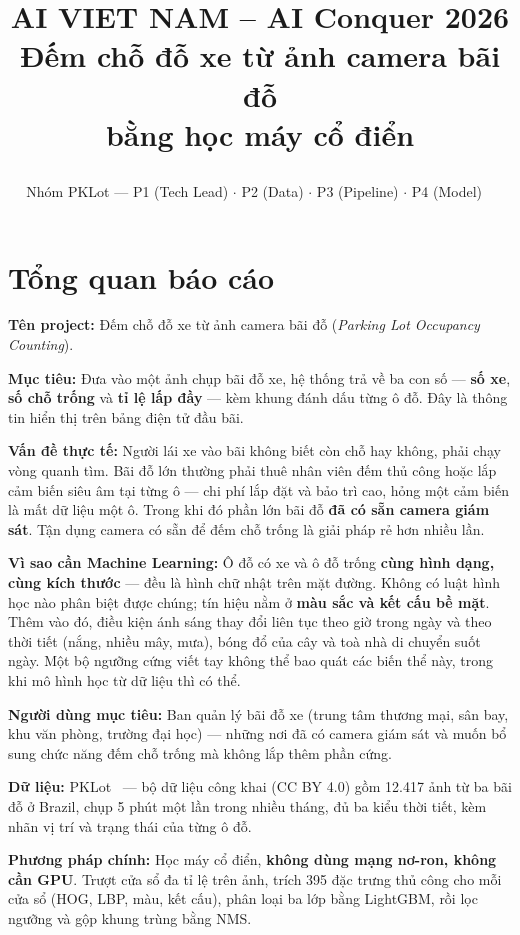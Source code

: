 \documentclass[12pt]{ai_conquer2026}
\title{%
  \begin{center}
        \Large {AI VIET NAM -- AI Conquer 2026}\\[.5ex]
        \Huge \textbf{Đếm chỗ đỗ xe từ ảnh camera bãi đỗ\\bằng học máy cổ điển}\\[.5ex]
  \end{center}
}
\author{
\begin{minipage}{\textwidth}
\centering
{
\vspace{-1.5em}
Nhóm PKLot --- P1 (Tech Lead) $\cdot$ P2 (Data) $\cdot$ P3 (Pipeline) $\cdot$ P4 (Model)
}\
\end{minipage}
}
\date{}
\begin{document}
\maketitle
\vspace{-5.5em}
\setlength{\epigraphwidth}{0.6\textwidth}

\section{Tổng quan báo cáo}

\textbf{Tên project:} Đếm chỗ đỗ xe từ ảnh camera bãi đỗ (\textit{Parking Lot Occupancy Counting}).

\textbf{Mục tiêu:} Đưa vào một ảnh chụp bãi đỗ xe, hệ thống trả về ba con số --- \textbf{số xe}, \textbf{số chỗ trống} và \textbf{tỉ lệ lấp đầy} --- kèm khung đánh dấu từng ô đỗ. Đây là thông tin hiển thị trên bảng điện tử đầu bãi.

\textbf{Vấn đề thực tế:} Người lái xe vào bãi không biết còn chỗ hay không, phải chạy vòng quanh tìm. Bãi đỗ lớn thường phải thuê nhân viên đếm thủ công hoặc lắp cảm biến siêu âm tại từng ô --- chi phí lắp đặt và bảo trì cao, hỏng một cảm biến là mất dữ liệu một ô. Trong khi đó phần lớn bãi đỗ \textbf{đã có sẵn camera giám sát}. Tận dụng camera có sẵn để đếm chỗ trống là giải pháp rẻ hơn nhiều lần.

\textbf{Vì sao cần Machine Learning:} Ô đỗ có xe và ô đỗ trống \textbf{cùng hình dạng, cùng kích thước} --- đều là hình chữ nhật trên mặt đường. Không có luật hình học nào phân biệt được chúng; tín hiệu nằm ở \textbf{màu sắc và kết cấu bề mặt}. Thêm vào đó, điều kiện ánh sáng thay đổi liên tục theo giờ trong ngày và theo thời tiết (nắng, nhiều mây, mưa), bóng đổ của cây và toà nhà di chuyển suốt ngày. Một bộ ngưỡng cứng viết tay không thể bao quát các biến thể này, trong khi mô hình học từ dữ liệu thì có thể.

\textbf{Người dùng mục tiêu:} Ban quản lý bãi đỗ xe (trung tâm thương mại, sân bay, khu văn phòng, trường đại học) --- những nơi đã có camera giám sát và muốn bổ sung chức năng đếm chỗ trống mà không lắp thêm phần cứng.

\textbf{Dữ liệu:} PKLot~\cite{pklot} --- bộ dữ liệu công khai (CC BY 4.0) gồm 12.417 ảnh từ ba bãi đỗ ở Brazil, chụp 5 phút một lần trong nhiều tháng, đủ ba kiểu thời tiết, kèm nhãn vị trí và trạng thái của từng ô đỗ.

\textbf{Phương pháp chính:} Học máy cổ điển, \textbf{không dùng mạng nơ-ron, không cần GPU}. Trượt cửa sổ đa tỉ lệ trên ảnh, trích 395 đặc trưng thủ công cho mỗi cửa sổ (HOG, LBP, màu, kết cấu), phân loại ba lớp bằng LightGBM, rồi lọc ngưỡng và gộp khung trùng bằng NMS.
\end{document}
